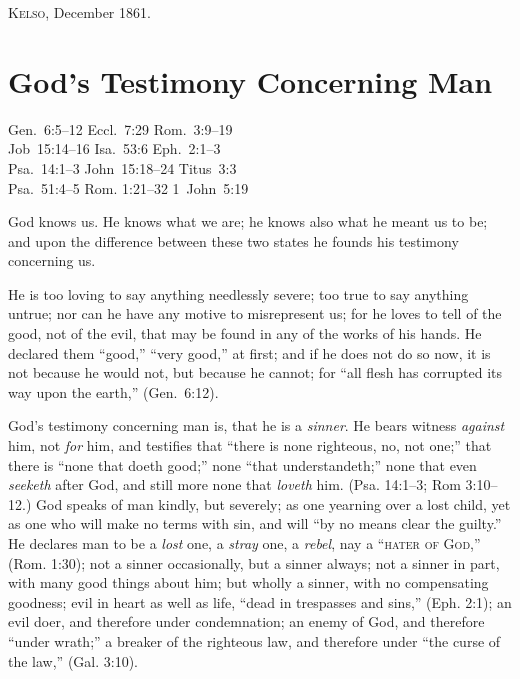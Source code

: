 \documentclass[
]{book}
\begin{document}
\textsc{Kelso}, December 1861.

\hypertarget{gods-testimony-concerning-man}{%
\chapter{God's Testimony Concerning Man}\label{gods-testimony-concerning-man}}

Gen.~6:5--12 \textbar{} Eccl.~7:29 \textbar{} Rom.~3:9--19 \textbar{}\\
Job~15:14--16 \textbar{} Isa.~53:6 \textbar{} Eph.~2:1--3 \textbar{}\\
Psa.~14:1--3 \textbar{} John~15:18--24 \textbar{} Titus~3:3 \textbar{}\\
Psa.~51:4--5 \textbar{} Rom. 1:21--32 \textbar{} 1~John~5:19 \textbar{}

God knows us. He knows what we are; he knows also what he meant us to be; and upon the difference between these two states he founds his testimony concerning us.

He is too loving to say anything needlessly severe; too true to say anything untrue; nor can he have any motive to misrepresent us; for he loves to tell of the good, not of the evil, that may be found in any of the works of his hands. He declared them ``good,'' ``very good,'' at first; and if he does not do so now, it is not because he would not, but because he cannot; for ``all flesh has corrupted its way upon the earth,'' (Gen.~6:12).

God's testimony concerning man is, that he is a \emph{sinner}. He bears witness \emph{against} him, not \emph{for} him, and testifies that ``there is none righteous, no, not one;'' that there is ``none that doeth good;'' none ``that understandeth;'' none that even \emph{seeketh} after God, and still more none that \emph{loveth} him. (Psa. 14:1--3; Rom 3:10--12.) God speaks of man kindly, but severely; as one yearning over a lost child, yet as one who will make no terms with sin, and will ``by no means clear the guilty.'' He declares man to be a \emph{lost} one, a \emph{stray} one, a \emph{rebel}, nay a ``\textsc{hater of God},'' (Rom. 1:30); not a sinner occasionally, but a sinner always; not a sinner in part, with many good things about him; but wholly a sinner, with no compensating goodness; evil in heart as well as life, ``dead in trespasses and sins,'' (Eph. 2:1); an evil doer, and therefore under condemnation; an enemy of God, and therefore ``under wrath;'' a breaker of the righteous law, and therefore under ``the curse of the law,'' (Gal. 3:10).
\end{document}
